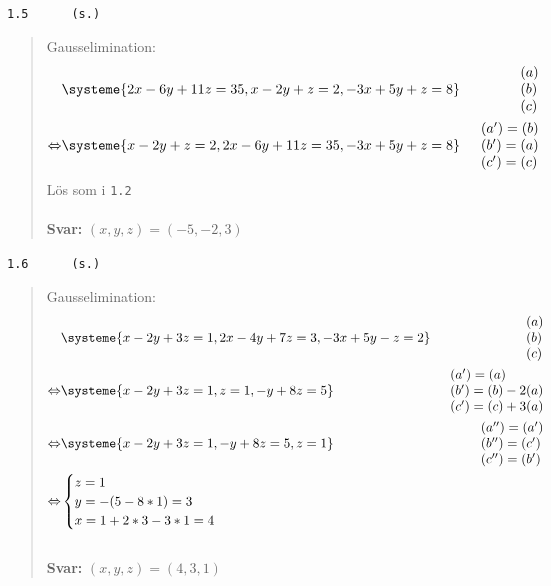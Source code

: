 \documentclass[a4paper]{article}
\newcommand{\tskcol}[1]{\textcolor{tskcol}{#1}}
\begin{document}
\pagebreak
\texttt{\tskcol{1.5~~~~~ (s.)}}
\begin{quotation}
	\noindent
	Gausselimination:
	\begin{align*}
		&\systeme{
			 2x-6y+11z=35,
			  x-2y+  z=2,
			-3x+5y+  z=8}  
		&\begin{array}{l} 
		(a) \\ 
		(b) \\
		(c)
		\end{array} \\ \Leftrightarrow
		&\systeme{
			x-2y+  z=2,
			2x-6y+11z=35,
			-3x+5y+  z=8}  
		&\begin{array}{l} 
		(a')=(b) \\ 
		(b')=(a) \\
		(c')=(c)
		\end{array}
	\end{align*}
	Lös som i \texttt{\tskcol{1.2}}
	\\ \\
	\textbf{Svar:} $(x,y,z)=(-5,-2,3)$
\end{quotation}

\texttt{\tskcol{1.6~~~~~ (s.)}}
\begin{quotation}
	\noindent
	Gausselimination:
	\begin{align*}
	&\systeme{
		  x-2y+3z=1,
		 2x-4y+7z=3,
		-3x+5y- z=2}  
	&\begin{array}{l} 
	(a) \\ 
	(b) \\
	(c)
	\end{array} \\ \Leftrightarrow
	&\systeme{
		  x-2y+3z=1,
		        z=1,
		   - y+8z=5}  
	&\begin{array}{l} 
	(a')=(a) \\ 
	(b')=(b)-2(a) \\
	(c')=(c)+3(a)
	\end{array} \\ \Leftrightarrow
	&\systeme{
		x-2y+3z=1,
		 - y+8z=5,
		      z=1}  
	&\begin{array}{l} 
	(a'')=(a') \\ 
	(b'')=(c') \\
	(c'')=(b')
	\end{array} \\ \Leftrightarrow
	&\begin{cases}
	z=1 \\
	y=-(5-8*1)=3\\
	x=1+2*3-3*1=4
	\end{cases}
	\end{align*}
	\\
	\textbf{Svar:} $(x,y,z)=(4,3,1)$
\end{quotation}
\end{document}

